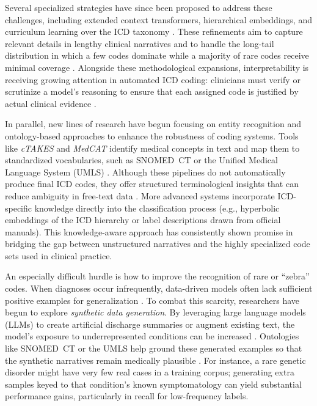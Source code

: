 Several specialized strategies have since been proposed to address these challenges, including extended context transformers, hierarchical embeddings, and curriculum learning over the ICD taxonomy \citep{nickel2017poincare,ren2022hicu,bengio2009curriculum}. These refinements aim to capture relevant details in lengthy clinical narratives and to handle the long-tail distribution in which a few codes dominate while a majority of rare codes receive minimal coverage \citep{rios2018few}. Alongside these methodological expansions, interpretability is receiving growing attention in automated ICD coding: clinicians must verify or scrutinize a model's reasoning to ensure that each assigned code is justified by actual clinical evidence \citep{holzinger2017we,warner2024modernbert}.

In parallel, new lines of research have begun focusing on entity recognition and ontology-based approaches to enhance the robustness of coding systems. Tools like \emph{cTAKES} \citep{savova2010ctakes} and \emph{MedCAT} \citep{kraljevic2021multi} identify medical concepts in text and map them to standardized vocabularies, such as SNOMED~CT \citep{donnelly2006snomedct} or the Unified Medical Language System (UMLS) \citep{bodenreider2004umls}. Although these pipelines do not automatically produce final ICD codes, they offer structured terminological insights that can reduce ambiguity in free-text data \citep{wu2018semehr}. More advanced systems incorporate ICD-specific knowledge directly into the classification process (e.g., hyperbolic embeddings of the ICD hierarchy \citep{cao2020hypercore} or label descriptions drawn from official manuals). This knowledge-aware approach has consistently shown promise in bridging the gap between unstructured narratives and the highly specialized code sets used in clinical practice.

An especially difficult hurdle is how to improve the recognition of rare or ``zebra'' codes. When diagnoses occur infrequently, data-driven models often lack sufficient positive examples for generalization \citep{rios2018few}. To combat this scarcity, researchers have begun to explore \emph{synthetic data generation}. By leveraging large language models (LLMs) to create artificial discharge summaries or augment existing text, the model's exposure to underrepresented conditions can be increased \citep{falis2022horsestozebras,falis2024gpt35}. Ontologies like SNOMED~CT or the UMLS help ground these generated examples so that the synthetic narratives remain medically plausible \citep{kumichev2024medsyn}. For instance, a rare genetic disorder might have very few real cases in a training corpus; generating extra samples keyed to that condition's known symptomatology can yield substantial performance gains, particularly in recall for low-frequency labels.

